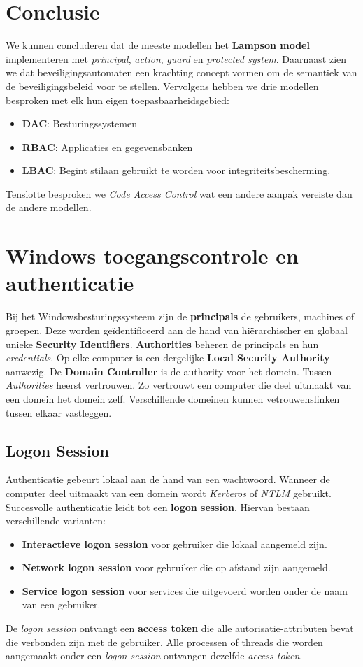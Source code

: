 \documentclass[../main.tex]{subfiles}
\begin{document}
\section{Conclusie}
We kunnen concluderen dat de meeste modellen het \textbf{Lampson model} implementeren met \textit{principal}, \textit{action}, \textit{guard} en \textit{protected system}. Daarnaast zien we dat beveiligingsautomaten een krachting concept vormen om de semantiek van de beveiligingsbeleid voor te stellen. Vervolgens hebben we drie modellen besproken met elk hun eigen toepasbaarheidsgebied:
\begin{itemize}
	\item \textbf{DAC}: Besturingssystemen
	\item \textbf{RBAC}: Applicaties en gegevensbanken
	\item \textbf{LBAC}: Begint stilaan gebruikt te worden voor integriteitsbescherming.
\end{itemize}
Tenslotte besproken we \textit{Code Access Control} wat een andere aanpak vereiste dan de andere modellen.

\section{Windows toegangscontrole en authenticatie}
Bij het Windowsbesturingssysteem zijn de \textbf{principals} de gebruikers, machines of groepen. Deze worden ge\"identificeerd aan de hand van hi\"erarchischer en globaal unieke  \textbf{Security Identifiers}. \textbf{Authorities} beheren de principals en hun \textit{credentials}. Op elke computer is een dergelijke \textbf{Local Security Authority} aanwezig. De \textbf{Domain Controller} is de authority voor het domein. Tussen \textit{Authorities} heerst vertrouwen. Zo vertrouwt een computer die deel uitmaakt van een domein het domein zelf. Verschillende domeinen kunnen vetrouwenslinken tussen elkaar vastleggen.
\subsection{Logon Session}
Authenticatie gebeurt lokaal aan de hand van een wachtwoord. Wanneer de computer deel uitmaakt van een domein wordt \textit{Kerberos} of \textit{NTLM} gebruikt. Succesvolle authenticatie leidt tot een \textbf{logon session}. Hiervan bestaan verschillende varianten:
\begin{itemize}
	\item \textbf{Interactieve logon session} voor gebruiker die lokaal aangemeld zijn.
	\item \textbf{Network logon session} voor gebruiker die op afstand zijn aangemeld.
	\item \textbf{Service logon session} voor services die uitgevoerd worden onder de naam van een gebruiker.
\end{itemize}
De \textit{logon session} ontvangt een \textbf{access token} die alle autorisatie-attributen bevat die verbonden zijn met de gebruiker. Alle processen of threads die worden aangemaakt onder een \textit{logon session} ontvangen dezelfde \textit{access token}.
\end{document}
